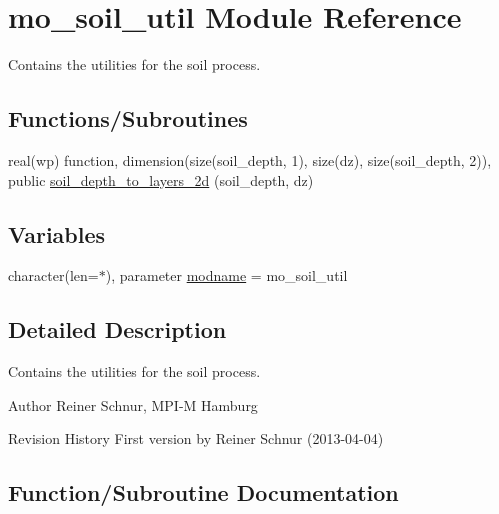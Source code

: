 \hypertarget{namespacemo__soil__util}{}\section{mo\+\_\+soil\+\_\+util Module Reference}
\label{namespacemo__soil__util}


Contains the utilities for the soil process.  


\subsection*{Functions/\+Subroutines}
\begin{DoxyCompactItemize}
\item 
real(wp) function, dimension(size(soil\+\_\+depth, 1), size(dz), size(soil\+\_\+depth, 2)), public \hyperlink{namespacemo__soil__util_ad78dd96d8e36c528df761c9769302d5f}{soil\+\_\+depth\+\_\+to\+\_\+layers\+\_\+2d} (soil\+\_\+depth, dz)
\end{DoxyCompactItemize}
\subsection*{Variables}
\begin{DoxyCompactItemize}
\item 
character(len=$\ast$), parameter \hyperlink{namespacemo__soil__util_aab312ec886be3b630752b30c016b5206}{modname} = \textquotesingle{}mo\+\_\+soil\+\_\+util\textquotesingle{}
\end{DoxyCompactItemize}


\subsection{Detailed Description}
Contains the utilities for the soil process. 

\begin{DoxyAuthor}{Author}
Reiner Schnur, M\+P\+I-\/\+M Hamburg
\end{DoxyAuthor}
\begin{DoxyParagraph}{Revision History}
First version by Reiner Schnur (2013-\/04-\/04) 
\end{DoxyParagraph}


\subsection{Function/\+Subroutine Documentation}
\hypertarget{namespacemo__soil__util_ad78dd96d8e36c528df761c9769302d5f}{}
